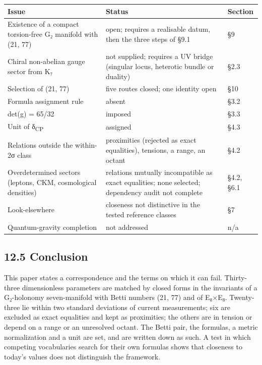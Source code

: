 \documentclass[11pt,a4paper]{article}
\begin{document}
\begin{longtable}[]{@{}
  >{\raggedright\arraybackslash}p{}
  >{\raggedright\arraybackslash}p{}
  >{\raggedright\arraybackslash}p{}@{}}
\toprule\noalign{}
\begin{minipage}[b]{\linewidth}\raggedright
Issue
\end{minipage} & \begin{minipage}[b]{\linewidth}\raggedright
Status
\end{minipage} & \begin{minipage}[b]{\linewidth}\raggedright
Section
\end{minipage} \\
\midrule\noalign{}
\endhead
\bottomrule\noalign{}
\endlastfoot
Existence of a compact torsion-free G₂ manifold with (21, 77) & open; requires a realisable datum, then the three steps of §9.1 & §9 \\
Chiral non-abelian gauge sector from K₇ & not supplied; requires a UV bridge (singular locus, heterotic bundle or duality) & §2.3 \\
Selection of (21, 77) & five routes closed; one identity open & §10 \\
Formula assignment rule & absent & §3.2 \\
det(g) = 65/32 & imposed & §3.3 \\
Unit of δ\textsubscript{CP} & assigned & §4.3 \\
Relations outside the within-2σ class & proximities (rejected as exact equalities), tensions, a range, an octant & §4.2 \\
Overdetermined sectors (leptons, CKM, cosmological densities) & relations mutually incompatible as exact equalities; none selected; dependency audit not complete & §4.2, §6.1 \\
Look-elsewhere & closeness not distinctive in the tested reference classes & §7 \\
Quantum-gravity completion & not addressed & n/a \\
\end{longtable}

\subsection{12.5 Conclusion}\label{conclusion}

This paper states a correspondence and the terms on which it can fail. Thirty-three dimensionless parameters are matched by closed forms in the invariants of a G₂-holonomy seven-manifold with Betti numbers (21, 77) and of E₈×E₈. Twenty-three lie within two standard deviations of current measurements; six are excluded as exact equalities and kept as proximities; the others are in tension or depend on a range or an unresolved octant. The Betti pair, the formulas, a metric normalization and a unit are set, and are written down as such. A test in which competing vocabularies search for their own formulas shows that closeness to today's values does not distinguish the framework.
\end{document}
